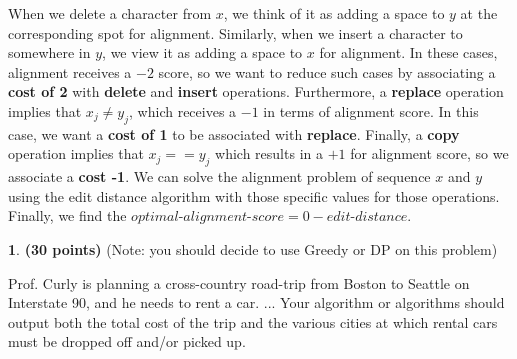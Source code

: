 \documentclass[11pt]{article}
\theoremstyle{definition}
\theoremstyle{theorem}
\newtheorem{prob}{}
\newcommand{\solution}{\medskip\noindent{\color{DarkBlue}\textbf{Solution:}}}
\begin{document}
\begin{enumerate}[label=\alph*.]
When we delete a character from $x$, we think of it as adding a space to $y$ at the corresponding spot for alignment. Similarly, when we insert a character to somewhere in $y$, we view it as adding a space to $x$ for alignment. In these cases, alignment receives a $-2$ score, so we want to reduce such cases by associating a \textbf{cost of 2} with \textbf{delete} and \textbf{insert} operations. Furthermore, a \textbf{replace} operation implies that $x_j \ne y_j$, which receives a $-1$ in terms of alignment score. In this case, we want a \textbf{cost of 1} to be associated with \textbf{replace}. Finally, a \textbf{copy} operation implies that $x_j == y_j$ which results in a $+1$ for alignment score, so we associate a \textbf{cost -1}. We can solve the alignment problem of sequence $x$ and $y$ using the edit distance algorithm with those specific values for those operations. Finally, we find the $\textit{optimal-alignment-score} = 0 - \textit{edit-distance}$.
\end{enumerate}


\newpage
\begin{prob} \textbf{(30 points)} (Note:  you should decide to use Greedy or DP on this problem)

\noindent Prof.  Curly is planning a cross-country road-trip from Boston to Seattle on Interstate 90, and he needs to rent a car. ... Your algorithm or algorithms should output both the total cost of the trip and the various cities at which rental cars must be dropped off and/or picked up.
\end{prob}
\solution
\end{document}

